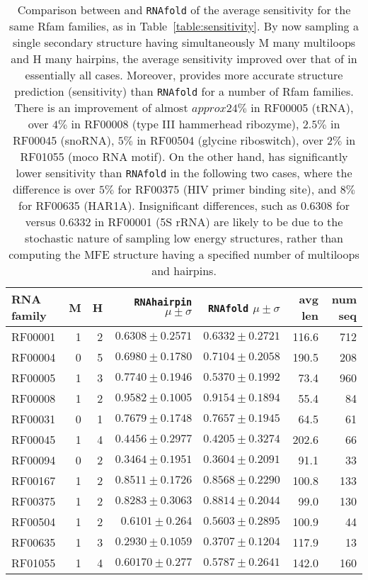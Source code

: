 \begin{table*}[!b]
\begin{tabular}{|l|rrrrrr|}
\hline
RNA family & M & H & {\tt RNAhairpin} $\mu \pm \sigma$ & {\tt RNAfold}
$\mu \pm \sigma$ & avg len & num seq\\
\hline
RF00001 & 1 & 2 & $0.6308 \pm 0.2571$ & $0.6332 \pm 0.2721$ & 116.6 & 712\\
RF00004 & 0 & 5 & $0.6980 \pm 0.1780$ & $0.7104 \pm 0.2058$ & 190.5 & 208 \\
RF00005 & 1 & 3 & $0.7740 \pm 0.1946$ & $0.5370 \pm 0.1992$ & 73.4 &960  \\
RF00008 & 1 & 2 & $0.9582 \pm 0.1005 $ & $0.9154 \pm 0.1894$ & 55.4 & 84\\
RF00031 & 0 & 1 & $0.7679 \pm 0.1748$ & $0.7657 \pm 0.1945$ & 64.5 & 61\\
RF00045 & 1 & 4 & $0.4456 \pm 0.2977$ & $0.4205 \pm 0.3274$ & 202.6 & 66 \\
RF00094 & 0 & 2 & $0.3464 \pm 0.1951$ & $0.3604 \pm 0.2091$ & 91.1 & 33\\
RF00167 & 1 & 2 & $0.8511 \pm 0.1726$ & $0.8568 \pm 0.2290$ & 100.8 & 133 \\
RF00375 & 1 & 2 & $0.8283 \pm 0.3063$ & $0.8814 \pm 0.2044$ & 99.0 & 130\\
RF00504 & 1 & 2 & $0.6101 \pm 0.264$ & $0.5603 \pm 0.2895$ & 100.9 & 44\\
RF00635 & 1 & 3 & $0.2930 \pm 0.1059$ & $0.3707 \pm 0.1204$ & 117.9 & 13\\
RF01055 & 1 & 4 & $0.60170 \pm 0.277$ & $0.5787 \pm 0.2641$ & 142.0 & 160 \\
\hline
\end{tabular}
\caption{Comparison between {\rnahairpinml} and {\tt RNAfold}
of the average sensitivity for the same Rfam families, as in
Table~\ref{table:sensitivity}. By now sampling a single secondary structure
having simultaneously M many multiloops and H many hairpins, the
average sensitivity improved over that of {\rnahairpin}
in essentially all cases.
Moreover, {\rnahairpinml} provides more accurate structure
prediction (sensitivity) than {\tt RNAfold} for a number of
Rfam families. There is an improvement
of almost $approx 24\%$ in RF00005 (tRNA),
over $4\%$ in RF00008 (type III hammerhead ribozyme),
$2.5\%$ in RF00045 (snoRNA),
$5\%$ in RF00504  (glycine riboswitch),
over $2\%$ in RF01055 (moco RNA motif).
On the other hand, {\rnahairpinml} has significantly lower
sensitivity than {\tt RNAfold} in the following two cases, where
the difference is over $5\%$ for RF00375 (HIV primer binding site),
and $8\%$ for RF00635 (HAR1A).
Insignificant differences, such as
$0.6308$ for {\rnahairpinml} versus $0.6332$ in RF00001 (5S rRNA)
are likely to be due to the stochastic nature of sampling low energy
structures, rather than computing the MFE structure having a specified
number of multiloops and hairpins.
}
\label{table:sensitivityMultiloopHairpin}
\end{table*}

